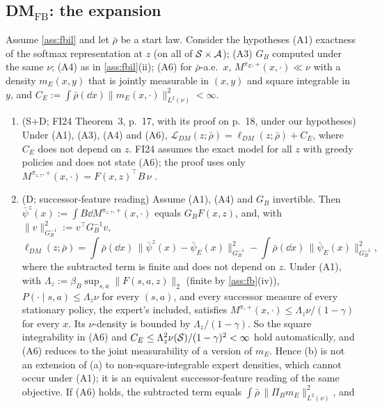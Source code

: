 \subsection{\texorpdfstring{DM$_{\mathrm{FB}}$}{DM-FB}: the expansion}\label{sec:fbil-dm}

\begin{theorem}\label{thm:fbil-dm}
Assume \cref{ass:fbil} and let $\bar\rho$ be a start law.
Consider the hypotheses
(A1) exactness of the softmax representation at $z$ (on all of $\mathcal{S}\times\mathcal{A}$);
(A3) $G_B$ computed under the same $\nu$;
(A4) as in \cref{ass:fbil}(ii);
(A6) for $\bar\rho$-a.e.\ $x$, $M^{\pi_E,+}(x,\cdot)\ll\nu$ with a density $m_E(x,y)$ that is jointly measurable in $(x,y)$ and square integrable in $y$, and $C_E:=\int\bar\rho(\dd x)\|m_E(x,\cdot)\|^2_{L^2(\nu)}<\infty$.
\begin{enumerate}[nosep,label=(\alph*)]
\item (\textsf{S+D}; FI24 Theorem~3, p.~17, with its proof on p.~18, under our hypotheses) Under (A1), (A3), (A4) and (A6), $\mathcal L_{DM}(z;\bar\rho)=\ell_{DM}(z;\bar\rho)+C_E$, where $C_E$ does not depend on $z$.
  FI24 assumes the exact model for all $z$ with greedy policies and does not state (A6); the proof uses only $M^{\pi_{z,\tau},+}(x,\cdot)=F(x,z)^\top B\,\nu$ .
\item (\textsf{D}; successor-feature reading) Assume (A1), (A4) and $G_B$ invertible.
  Then $\bar\psi^{z}(x):=\int B\dd M^{\pi_{z,\tau},+}(x,\cdot)$ equals $G_BF(x,z)$, and, with $\|v\|^2_{G_B^{-1}}:=v^\top G_B^{-1}v$,
  \[
  \ell_{DM}(z;\bar\rho)=\int\bar\rho(\dd x)\,\big\|\bar\psi^{z}(x)-\bar\psi_E(x)\big\|^2_{G_B^{-1}}-\int\bar\rho(\dd x)\,\|\bar\psi_E(x)\|^2_{G_B^{-1}},
  \]
  where the subtracted term is finite and does not depend on $z$.
  Under (A1), with $\Lambda_z:=\beta_B\sup_{s,a}\|F(s,a,z)\|_2$ (finite by \cref{ass:fb}(iv)), $P(\cdot\mid s,a)\le \Lambda_z\nu$ for every $(s,a)$, and every successor measure of every stationary policy, the expert's included, satisfies $M^{\pi,+}(x,\cdot)\le \Lambda_z\nu/(1-\gamma)$ for every $x$.
  Its $\nu$-density is bounded by $\Lambda_z/(1-\gamma)$. So the square integrability in (A6) and $C_E\le \Lambda_z^2\nu(\mathcal{S})/(1-\gamma)^2<\infty$ hold automatically, and (A6) reduces to the joint measurability of a version of $m_E$.
  Hence (b) is not an extension of (a) to non-square-integrable expert densities, which cannot occur under (A1); it is an equivalent successor-feature reading of the same objective.
  If (A6) holds, the subtracted term equals $\int\bar\rho\,\|\Pi_Bm_E\|^2_{L^2(\nu)}$, and

\end{enumerate}
\end{theorem}
